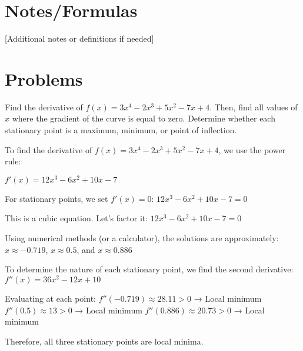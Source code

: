 
\hrulefill

\section*{Notes/Formulas}

[Additional notes or definitions if needed]

\hrulefill

\section*{Problems}



\begin{problem}{10}
Find the derivative of $f(x) = 3x^4 - 2x^3 + 5x^2 - 7x + 4$. Then, find all values of $x$ where the gradient of the curve is equal to zero. Determine whether each stationary point is a maximum, minimum, or point of inflection.

\begin{solution}
To find the derivative of $f(x) = 3x^4 - 2x^3 + 5x^2 - 7x + 4$, we use the power rule:

$f'(x) = 12x^3 - 6x^2 + 10x - 7$

For stationary points, we set $f'(x) = 0$:
$12x^3 - 6x^2 + 10x - 7 = 0$

This is a cubic equation. Let's factor it:
$12x^3 - 6x^2 + 10x - 7 = 0$

Using numerical methods (or a calculator), the solutions are approximately:
$x \approx -0.719$, $x \approx 0.5$, and $x \approx 0.886$

To determine the nature of each stationary point, we find the second derivative:
$f''(x) = 36x^2 - 12x + 10$

Evaluating at each point:
$f''(-0.719) \approx 28.11 > 0$ → Local minimum
$f''(0.5) \approx 13 > 0$ → Local minimum
$f''(0.886) \approx 20.73 > 0$ → Local minimum

Therefore, all three stationary points are local minima.

\end{solution}
\end{problem}

